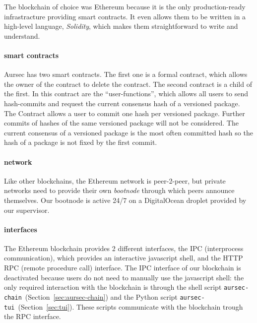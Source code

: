 The blockchain of choice was Ethereum because it is the only production-ready infrastracture providing smart contracts. It even allows them to be written in a high-level language, \emph{Solidity}, which makes them straightforward to write and understand.

\paragraph*{smart contracts}
Aursec has two smart contracts. The first one is a formal contract, which allows the owner of the contract to delete the contract. The second contract is a child of the first. In this contract are the ``user-functions'', which allows all users to send hash-commits and request the current consensus hash of a versioned package. The Contract allows a user to commit one hash per versioned package. Further commits of hashes of the same versioned package will not be considered. The current consensus of a versioned package is the most often committed hash so the hash of a package is not fixed by the first commit.

\paragraph*{network}
Like other blockchains, the Ethereum network is peer-2-peer, but private networks need to provide their own \emph{bootnode} through which peers announce themselves. Our bootnode is active 24/7 on a DigitalOcean droplet provided by our supervisor.

\paragraph*{interfaces}
The Ethereum blockchain provides 2 different interfaces, the IPC (interprocess communication), which provides an interactive javascript shell, and the HTTP RPC (remote procedure call) interface. The IPC interface of our blockchain is deactivated because users do not need to manually use the javascript shell: the only required interaction with the blockchain is through the shell script \texttt{aursec-chain}~(Section~\ref{sec:aursec-chain}) and the Python script \texttt{aursec-tui}~(Section~\ref{sec:tui}). These scripts communicate with the blockchain trough the RPC interface.
